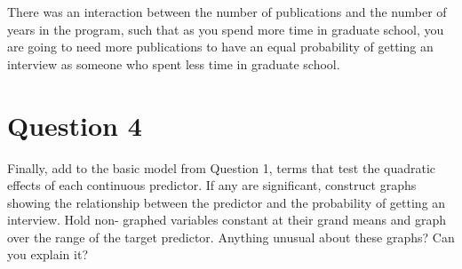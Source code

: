 \documentclass{article}\usepackage[]{graphicx}\usepackage[]{color}
\begin{document}
There was an interaction between the number of publications and the number of years in the program, such that as you spend more time in graduate school, you are going to need more publications to have an equal probability of getting an interview as someone who spent less time in graduate school.

\section{Question 4}
Finally, add to the basic model from Question 1, terms that test the quadratic effects of each continuous predictor. If any are significant, construct graphs showing the relationship between the predictor and the probability of getting an interview. Hold non- graphed variables constant at their grand means and graph over the range of the target predictor. Anything unusual about these graphs? Can you explain it?
\end{document}
